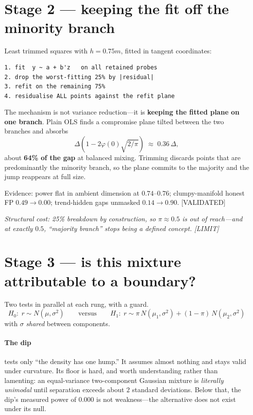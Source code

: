 \documentclass[11pt]{article}
\newcommand{\provtag}[2]{{\footnotesize\sffamily\textcolor{#1}{[#2]}}}
\newcommand{\VALID}{\provtag{okgreen}{VALIDATED}}
\newcommand{\LIMIT}{\provtag{limred}{LIMIT}}
\newcommand{\why}[1]{\par\smallskip\noindent\textcolor{muted}{\small\itshape #1}\par\smallskip}
\begin{document}
\section{Stage 2 --- keeping the fit off the minority branch}
\label{sec:stage2}

Least trimmed squares with $h = 0.75m$, fitted in tangent coordinates:

\begin{codebox}
\begin{verbatim}
1. fit  y ~ a + b'z   on all retained probes
2. drop the worst-fitting 25% by |residual|
3. refit on the remaining 75%
4. residualise ALL points against the refit plane
\end{verbatim}
\end{codebox}

The mechanism is not variance reduction---it is \textbf{keeping the fitted plane on one branch}.
Plain OLS finds a compromise plane tilted between the two branches and absorbs
\[
  \Delta\left(1 - 2\varphi(0)\sqrt{2/\pi}\right) \;\approx\; 0.36\,\Delta,
\]
about \textbf{64\% of the gap} at balanced mixing. Trimming discards points that are
predominantly the minority branch, so the plane commits to the majority and the jump reappears at
full size.

Evidence: power flat in ambient dimension at $0.74$--$0.76$; clumpy-manifold honest FP
$0.49 \to 0.00$; trend-hidden gaps unmasked $0.14 \to 0.90$. \VALID

\why{Structural cost: 25\% breakdown by construction, so $\pi \approx 0.5$ is out of reach---and
at exactly $0.5$, ``majority branch'' stops being a defined concept. \LIMIT}

\section{Stage 3 --- is this mixture attributable to a boundary?}
\label{sec:stage3}

Two tests in parallel at each rung, with a guard.
\[
  H_0:\; r \sim N(\mu,\sigma^2)
  \qquad\text{versus}\qquad
  H_1:\; r \sim \pi\,N(\mu_1,\sigma^2) + (1-\pi)\,N(\mu_2,\sigma^2)
\]
with $\sigma$ \emph{shared} between components.

\paragraph{The dip} tests only ``the density has one hump.'' It assumes almost nothing and stays
valid under curvature. Its floor is hard, and worth understanding rather than lamenting: an
equal-variance two-component Gaussian mixture is \emph{literally unimodal} until separation
exceeds about $2$ standard deviations. Below that, the dip's measured power of $0.000$ is not
weakness---the alternative does not exist under its null.
\end{document}

